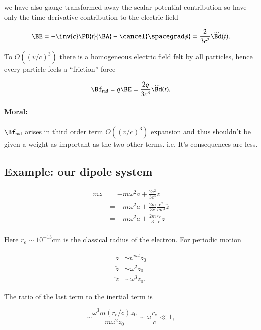 we have also gauge transformed away the scalar potential contribution so have only the time derivative contribution to the electric field

\begin{equation}\label{eqn:relativisticElectrodynamicsL27:170}
\BE = -\inv{c} \PD{t}{\BA} - \cancel{\spacegrad \phi} = \frac{2}{3 c^2} \dddot{\Bd}(t).
\end{equation}

To $O((v/c)^3)$ there is a homogeneous electric field felt by all particles, hence every particle feels a ``friction'' force

\begin{equation}\label{eqn:relativisticElectrodynamicsL27:190}
\Bf_{\text{rad}} = q \BE = \frac{2 q}{3 c^3} \dddot{\Bd}(t).
\end{equation}

\paragraph{Moral:} $\Bf_{\text{rad}}$ arises in third order term $O((v/c)^3)$ expansion and thus shouldn't be given a weight as important as the two other terms.  i.e.  It's consequences are less.

\subsection{Example: our dipole system}

\begin{align*}
m \ddot{z} 
&= - m \omega^2 a + \frac{2 e^2}{3 c^3} \dddot{z} \\
&= - m \omega^2 a + \frac{2 m}{3 c} \frac{e^2}{m c^2} \dddot{z} \\
&= - m \omega^2 a + \frac{2 m}{3} \frac{r_e}{c} \dddot{z} \\
\end{align*}

Here $r_e \sim 10^{-13} \text{cm}$ is the classical radius of the electron.  For periodic motion 

\begin{align*}
z &\sim e^{i \omega t} z_0 \\
\ddot{z} &\sim \omega^2 z_0 \\
\dddot{z} &\sim \omega^3 z_0.
\end{align*}

The ratio of the last term to the inertial term is

\begin{equation}\label{eqn:relativisticElectrodynamicsL27:210}
\sim \frac{ \omega^3 m (r_e/c) z_0 }{ m \omega^2 z_0 } \sim \omega \frac{r_e}{c} \ll 1,
\end{equation}

